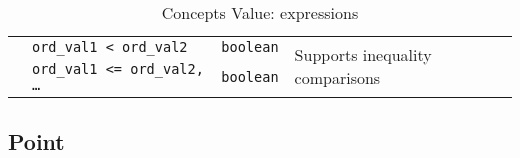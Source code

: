 \begin{table}[!htbp]
\begin{scriptsize}
\begin{tabular}{llll}
      \multicolumn{1}{c|}{}                                 & \texttt{ord\_val1 < ord\_val2}                                       & \texttt{boolean}
                                                            & \multicolumn{1}{l}{\multirow{2}{*}{Supports inequality comparisons}}                    \\
      \multicolumn{1}{c|}{}                                 & \texttt{ord\_val1 <= ord\_val2, \dots}                               & \texttt{boolean}
                                                            & \multicolumn{1}{l}{}                                                                    \\
      \cline{1-4}
    \end{tabular}
    \smallskip

    \caption{Concepts Value: expressions}
  \end{scriptsize}
  \label{concept.tables.value.expressions}
\end{table}


\subsection{Point}
\label{image_and_algorithms_taxonomy.concepts.subsec.point}


